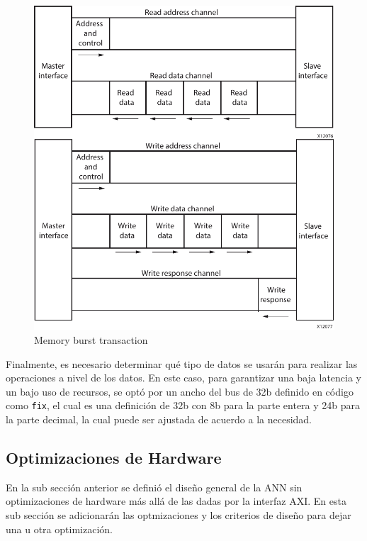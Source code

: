 \begin{figure}[H]
	\centering
		\includegraphics[scale=0.8]{./Figures/I2.pdf}
	\caption{Memory burst transaction \citep{AXI2017}}
	\label{fig:memBurst}
\end{figure}

Finalmente, es necesario determinar qué tipo de datos se usarán para realizar las operaciones a nivel de los datos. En este caso, para garantizar una baja latencia y un bajo uso de recursos, se optó por un ancho del bus de 32b definido en código como \texttt{fix}, el cual es una definición de 32b con 8b para la parte entera y 24b para la parte decimal, la cual puede ser ajustada de acuerdo a la necesidad.

\subsection{Optimizaciones de Hardware}

En la sub sección anterior se definió el diseño general de la ANN sin optimizaciones de hardware más allá de las dadas por la interfaz AXI. En esta sub sección se adicionarán las optmizaciones y los criterios de diseño para dejar una u otra optimización.

